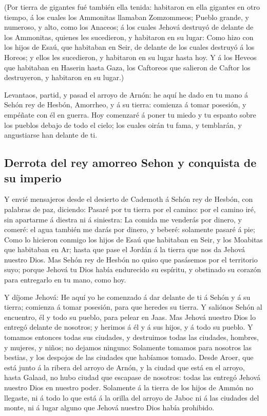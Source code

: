  (Por tierra de gigantes fué también ella tenida: habitaron
en ella gigantes en otro tiempo, á los cuales los Ammonitas llamaban
Zomzommeos;  Pueblo grande, y numeroso, y alto, como los
Anaceos; á los cuales Jehová destruyó de delante de los Ammonitas,
quienes les sucedieron, y habitaron en su lugar:  Como hizo
con los hijos de Esaú, que habitaban en Seir, de delante de los cuales
destruyó á los Horeos; y ellos les sucedieron, y habitaron en su lugar
hasta hoy.  Y á los Heveos que habitaban en Haserin hasta
Gaza, los Caftoreos que salieron de Caftor los destruyeron, y habitaron
en su lugar.)

 Levantaos, partid, y pasad el arroyo de Arnón: he aquí he
dado en tu mano á Sehón rey de Hesbón, Amorrheo, y á su tierra: comienza
á tomar posesión, y empéñate con él en guerra.  Hoy
comenzaré á poner tu miedo y tu espanto sobre los pueblos debajo de todo
el cielo; los cuales oirán tu fama, y temblarán, y angustiarse han
delante de ti.

\hypertarget{derrota-del-rey-amorreo-sehon-y-conquista-de-su-imperio}{%
\subsection{Derrota del rey amorreo Sehon y conquista de su
imperio}\label{derrota-del-rey-amorreo-sehon-y-conquista-de-su-imperio}}

 Y envié mensajeros desde el desierto de Cademoth á Sehón
rey de Hesbón, con palabras de paz, diciendo:  Pasaré por
tu tierra por el camino: por el camino iré, sin apartarme á diestra ni á
siniestra:  La comida me venderás por dinero, y comeré: el
agua también me darás por dinero, y beberé: solamente pasaré á pie;
 Como lo hicieron conmigo los hijos de Esaú que habitaban
en Seir, y los Moabitas que habitaban en Ar; hasta que pase el Jordán á
la tierra que nos da Jehová nuestro Dios.  Mas Sehón rey de
Hesbón no quiso que pasásemos por el territorio suyo; porque Jehová tu
Dios había endurecido su espíritu, y obstinado su corazón para
entregarlo en tu mano, como hoy.

 Y díjome Jehová: He aquí yo he comenzado á dar delante de
ti á Sehón y á su tierra; comienza á tomar posesión, para que heredes su
tierra.  Y saliónos Sehón al encuentro, él y todo su
pueblo, para pelear en Jaas.  Mas Jehová nuestro Dios lo
entregó delante de nosotros; y herimos á él y á sus hijos, y á todo su
pueblo.  Y tomamos entonces todas sus ciudades, y
destruimos todas las ciudades, hombres, y mujeres, y niños; no dejamos
ninguno:  Solamente tomamos para nosotros las bestias, y
los despojos de las ciudades que habíamos tomado.  Desde
Aroer, que está junto á la ribera del arroyo de Arnón, y la ciudad que
está en el arroyo, hasta Galaad, no hubo ciudad que escapase de
nosotros: todas las entregó Jehová nuestro Dios en nuestro poder.
 Solamente á la tierra de los hijos de Ammón no llegaste,
ni á todo lo que está á la orilla del arroyo de Jaboc ni á las ciudades
del monte, ni á lugar alguno que Jehová nuestro Dios había prohibido.

